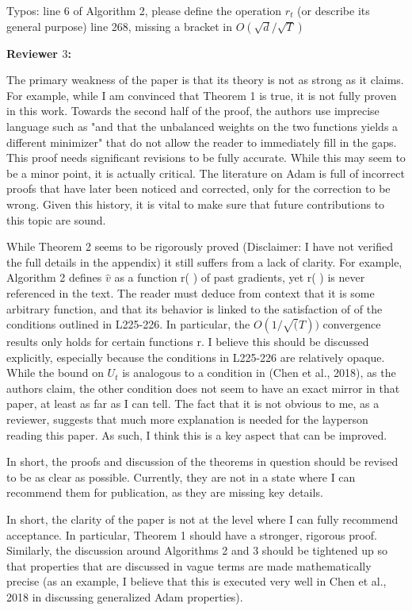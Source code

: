 \documentclass{article}
\begin{document}
Typos:
line 6 of Algorithm 2, please define the operation $r_t$ (or describe its general purpose)
line 268, missing a bracket in $O(\sqrt{d}/ \sqrt{T})$

\textbf{Reviewer $3$:}

The primary weakness of the paper is that its theory is not as strong as it claims. For example, while I am convinced that Theorem 1 is true, it is not fully proven in this work. Towards the second half of the proof, the authors use imprecise language such as "and that the unbalanced weights on the two functions yields a different minimizer" that do not allow the reader to immediately fill in the gaps. This proof needs significant revisions to be fully accurate. While this may seem to be a minor point, it is actually critical. The literature on Adam is full of incorrect proofs that have later been noticed and corrected, only for the correction to be wrong. Given this history, it is vital to make sure that future contributions to this topic are sound.

While Theorem 2 seems to be rigorously proved (Disclaimer: I have not verified the full details in the appendix) it still suffers from a lack of clarity. For example, Algorithm 2 defines $\hat{v}$ as a function r( ) of past gradients, yet r( ) is never referenced in the text. The reader must deduce from context that it is some arbitrary function, and that its behavior is linked to the satisfaction of of the conditions outlined in L225-226. In particular, the $O(1/\sqrt(T))$ convergence results only holds for certain functions r. I believe this should be discussed explicitly, especially because the conditions in L225-226 are relatively opaque. While the bound on $U_t$ is analogous to a condition in (Chen et al., 2018), as the authors claim, the other condition does not seem to have an exact mirror in that paper, at least as far as I can tell. The fact that it is not obvious to me, as a reviewer, suggests that much more explanation is needed for the layperson reading this paper. As such, I think this is a key aspect that can be improved.

In short, the proofs and discussion of the theorems in question should be revised to be as clear as possible. Currently, they are not in a state where I can recommend them for publication, as they are missing key details.

In short, the clarity of the paper is not at the level where I can fully recommend acceptance. In particular, Theorem 1 should have a stronger, rigorous proof. Similarly, the discussion around Algorithms 2 and 3 should be tightened up so that properties that are discussed in vague terms are made mathematically precise (as an example, I believe that this is executed very well in Chen et al., 2018 in discussing generalized Adam properties).
\end{document}

